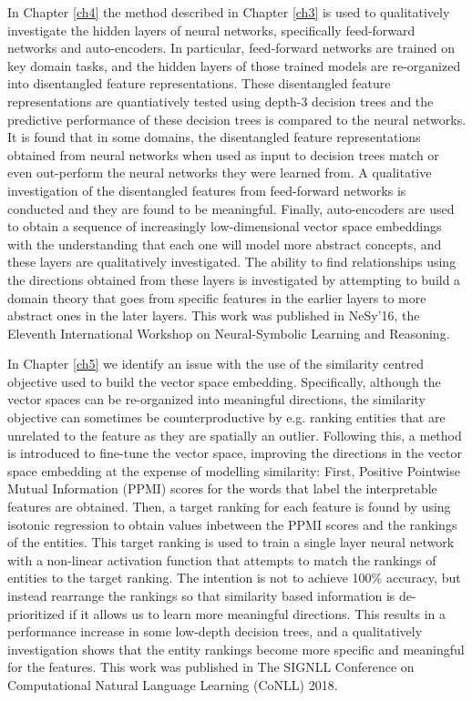 In Chapter \ref{ch4} the method described in Chapter \ref{ch3} is used to qualitatively investigate the hidden layers of neural networks, specifically feed-forward networks and auto-encoders. In particular, feed-forward networks are trained on key domain tasks, and the hidden layers of those trained models are re-organized into disentangled feature representations. These disentangled feature representations are quantiatively tested using depth-3 decision trees and the predictive performance of these decision trees is compared to the neural networks. It is found that in some domains, the disentangled feature representations obtained from neural networks when used as input to decision trees match or even out-perform the neural networks they were learned from. A qualitative investigation of the disentangled features from feed-forward networks is conducted and they are found to be meaningful. Finally, auto-encoders are used to obtain a sequence of increasingly low-dimensional vector space embeddings with the understanding that each one will model more abstract concepts, and these layers are qualitatively investigated. The ability to find relationships  using the directions obtained from these layers is investigated  by attempting to build a domain theory that goes from specific features in the earlier layers to more abstract ones in the later layers. This work was published in NeSy'16, the Eleventh International Workshop on Neural-Symbolic Learning and Reasoning.

In Chapter \ref{ch5} we identify an issue with the use of the similarity centred objective used to build the vector space embedding. Specifically, although the vector spaces can be re-organized into meaningful directions, the similarity objective can sometimes be counterproductive by e.g. ranking entities that are unrelated to the feature as they are spatially an outlier. Following this, a method is introduced to fine-tune the vector space, improving the directions in the vector space embedding at the expense of modelling similarity: First, Positive Pointwise Mutual Information (PPMI) scores for the words that label the interpretable features are obtained. Then, a target ranking for each feature is found by using isotonic regression to obtain values inbetween the PPMI scores and the rankings of the entities. This target ranking is used to train a single layer neural network with a non-linear activation function that attempts to match the rankings of entities to the target ranking. The intention is not to achieve 100\% accuracy, but instead rearrange the rankings so that similarity based information is de-prioritized if it allows us to learn more meaningful directions. This results in a performance increase in some low-depth decision trees,  and a qualitatively investigation shows that the entity rankings become more specific and meaningful for the features. This work was published in The SIGNLL Conference on Computational Natural Language Learning (CoNLL) 2018.

